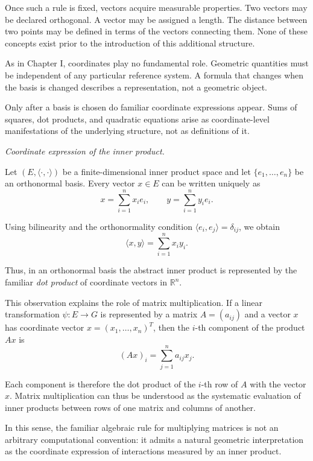 \medskip

Once such a rule is fixed, vectors acquire measurable properties.
Two vectors may be declared orthogonal.
A vector may be assigned a length.
The distance between two points may be defined in terms of the vectors
connecting them.
None of these concepts exist prior to the introduction of this additional
structure.

\medskip

As in Chapter I, coordinates play no fundamental role.
Geometric quantities must be independent of any particular reference system.
A formula that changes when the basis is changed describes a representation,
not a geometric object.

\medskip

Only after a basis is chosen do familiar coordinate expressions appear.
Sums of squares, dot products, and quadratic equations arise as coordinate-level
manifestations of the underlying structure, not as definitions of it.

\medskip

\textit{Coordinate expression of the inner product.}

Let $(E,\langle\cdot,\cdot\rangle)$ be a finite-dimensional inner product space
and let $\{e_1,\dots,e_n\}$ be an orthonormal basis.
Every vector $x\in E$ can be written uniquely as
\[
x=\sum_{i=1}^n x_i e_i,
\qquad
y=\sum_{i=1}^n y_i e_i.
\]

Using bilinearity and the orthonormality condition
$\langle e_i,e_j\rangle=\delta_{ij}$, we obtain
\[
\langle x,y\rangle
=
\sum_{i=1}^n x_i y_i.
\]

Thus, in an orthonormal basis the abstract inner product is represented by the
familiar \emph{dot product} of coordinate vectors in $\mathbb{R}^n$.

\medskip

This observation explains the role of matrix multiplication.
If a linear transformation $\psi:E\to G$ is represented by a matrix
$A=(a_{ij})$ and a vector $x$ has coordinate vector $x=(x_1,\dots,x_n)^T$,
then the $i$-th component of the product $Ax$ is
\[
(Ax)_i=\sum_{j=1}^n a_{ij}x_j.
\]

Each component is therefore the dot product of the $i$-th row of $A$
with the vector $x$.
Matrix multiplication can thus be understood as the systematic evaluation of
inner products between rows of one matrix and columns of another.

\medskip

In this sense, the familiar algebraic rule for multiplying matrices is not an
arbitrary computational convention: it admits a natural geometric interpretation
as the coordinate expression of interactions measured by an inner product.

